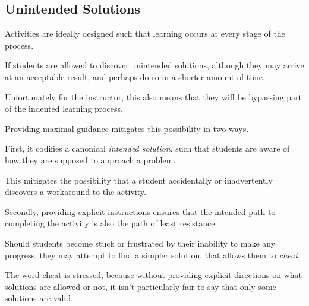                                 



    \subsection{Unintended Solutions}



        Activities are ideally designed such that learning occurs at every stage of the process. %



If students are allowed to discover unintended solutions, although they may arrive at an acceptable result, and perhaps do so in a shorter amount of time. %



Unfortunately for the instructor, this also means that they will be bypassing part of the indented learning process. %



Providing maximal guidance mitigates this possibility in two ways. %



First, it codifies a canonical \emph{intended solution}, such that students are aware of how they are supposed to approach a problem. %



This mitigates the possibility that a student accidentally or inadvertently discovers a workaround to the activity. %



Secondly, providing explicit instructions ensures that the intended path to completing the activity is also the path of least resistance. %



Should students become stuck or frustrated by their inability to make any progress, they may attempt to find a simpler solution, that allows them to \emph{cheat}. %



The word cheat is stressed, because without providing explicit directions on what solutions are allowed or not, it isn't particularly fair to say that only some solutions are valid. 







        



    







        







